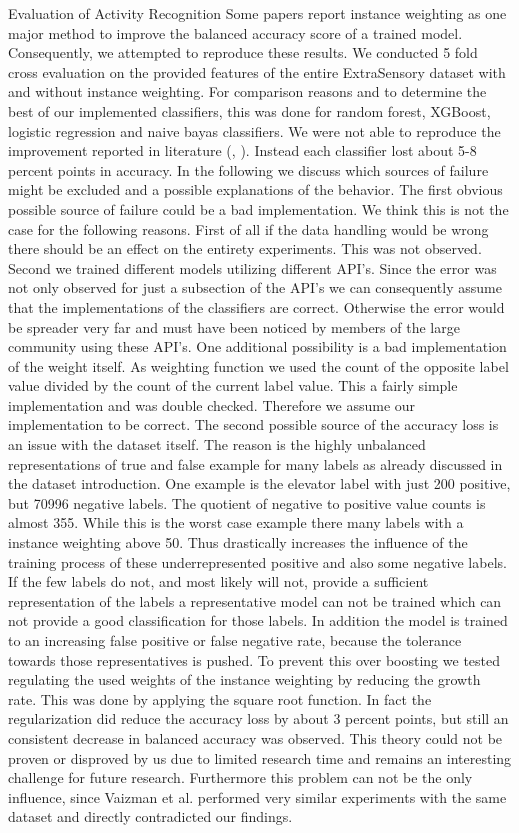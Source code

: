 \begin{section}{Evaluation of Activity Recognition}
	Some papers report instance weighting as one major method to improve the balanced accuracy score of a trained model. Consequently, we attempted to reproduce these results. We conducted 5 fold cross evaluation on the provided features of the entire ExtraSensory dataset with and without instance weighting. For comparison reasons and to determine the best of our implemented classifiers, this was done for random forest, XGBoost, logistic regression and naive bayas classifiers. 
	We were not able to reproduce the improvement reported in literature (\cite{Vaizman18}, \cite{Saeed18}). Instead each classifier lost about 5-8 percent points in accuracy. In the following we discuss which sources of failure might be excluded and a possible explanations of the behavior. 
	The first obvious possible source of failure could be a bad implementation. We think this is not the case for the following reasons. First of all if the data handling would be wrong there should be an effect on the entirety experiments. This was not observed. Second we trained different models utilizing different API's. Since the error was not only observed for just a subsection of the API's we can consequently assume that the implementations of the classifiers are correct. Otherwise the error would be spreader very far and must have been noticed by members of the large community using these API's. One additional possibility is a bad implementation of the weight itself. As weighting function we used the count of the opposite label value divided by the count of the current label value. This a fairly simple implementation and was double checked. Therefore we assume our implementation to be correct. 
	The second possible source of the accuracy loss is an issue with the dataset itself. The reason is the highly unbalanced representations of true and false example for many labels as already discussed in the dataset introduction. One example is the elevator label with just 200 positive, but 70996 negative labels. The quotient of negative to positive value counts is almost 355. While this is the worst case example there many labels with a instance weighting above 50. Thus drastically increases the influence of the training process of these underrepresented positive and also some negative labels. If the few labels do not, and most likely will not, provide a sufficient representation of the labels a representative model can not be trained which can not provide a good classification for those labels. In addition the model is trained to an increasing false positive or false negative rate, because the tolerance towards those representatives is pushed.
	To prevent this over boosting we tested regulating the used weights of the instance weighting by reducing the growth rate. This was done by applying the square root function. In fact the regularization did reduce the accuracy loss by about 3 percent points, but still an consistent decrease in balanced accuracy was observed. This theory could not be proven or disproved by us due to limited research time and remains an interesting challenge for future research. Furthermore this problem can not be the only influence, since Vaizman et al. performed very similar experiments with the same dataset and directly contradicted our findings.
	

\end{section}
